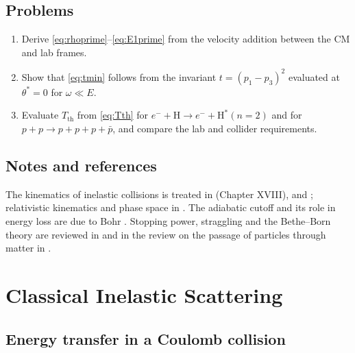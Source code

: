\documentclass[11pt,a4paper]{book}
\numberwithin{equation}{chapter}
\begin{document}
\section{Problems}
\begin{enumerate}
  \item Derive \eqref{eq:rhoprime}--\eqref{eq:E1prime} from the velocity
        addition between the CM and lab frames.
  \item Show that \eqref{eq:tmin} follows from the invariant
        $t=(p_1-p_3)^2$ evaluated at $\theta^*=0$ for $\omega\ll E$.
  \item Evaluate $T_{\mathrm{th}}$ from \eqref{eq:Tth} for
        $e^-+\mathrm{H}\to e^-+\mathrm{H}^*(n=2)$ and for
        $p+p\to p+p+p+\bar p$, and compare the lab and collider requirements.
\end{enumerate}

\section*{Notes and references}
The kinematics of inelastic collisions is treated in \cite{LL3} (Chapter XVIII), \cite{MM} and \cite{BJ}; relativistic kinematics and phase space in \cite{BK,Hagedorn,PDG}. The adiabatic cutoff and its role in energy loss are due to Bohr \cite{Bohr13,Bohr48}. Stopping power, straggling and the Bethe--Born theory are reviewed in \cite{Fano63,Inokuti71,Sigmund} and in the review on the passage of particles through matter in \cite{PDG}.

\chapter{Classical Inelastic Scattering}

\section{Energy transfer in a Coulomb collision}\label{sec:impulse}
\end{document}
